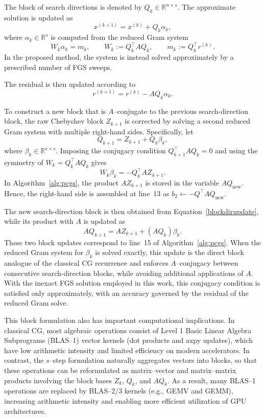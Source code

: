 \documentclass[pdflatex,sn-mathphys-num]{sn-jnl}%
\begin{document}
The block of search directions is denoted by
$Q_k\in\mathbb{R}^{n\times s}$. 
The approximate solution is updated as
\[
x^{(k+1)}=x^{(k)}+Q_k\alpha_k,
\]
where $\alpha_k\in\mathbb{R}^s$ is computed from the
reduced Gram system
\[
W_k\alpha_k=m_k,
\qquad
W_k:=Q_k^\top A Q_k,
\qquad
m_k:=Q_k^\top r^{(k)}.
\]
In the proposed method, the
system is instead solved approximately by a prescribed number of FGS sweeps.

The residual is then updated according to
\[
r^{(k+1)} = r^{(k)} - A Q_k \alpha_k .
\]

To construct a new block that is $A$--conjugate to the previous
search-direction block, the raw Chebyshev block $Z_{k+1}$ is corrected
by solving a second reduced Gram system with multiple right-hand
sides. Specifically, let
\begin{equation}
\label{blockdirupdate}
Q_{k+1}=Z_{k+1}+Q_k\beta_k,
\end{equation}
where $\beta_k\in\mathbb{R}^{s\times s}$. Imposing the conjugacy condition $Q_{k+1}^\top A Q_k=0$ and using the symmetry of $W_k=Q_k^\top A Q_k$
gives
\[
W_k\beta_k=-Q_k^\top A Z_{k+1}.
\]
In Algorithm~\ref{alg:pcgs}, the product $AZ_{k+1}$ is stored in the
variable $AQ_{\mathrm{new}}$. Hence, the right-hand side is assembled
at line~13 as $
b_2\gets -Q^\top AQ_{\mathrm{new}}.$

The new search-direction block is then obtained from
Equation~\eqref{blockdirupdate}, while its product with $A$ is updated
as
\[
A Q_{k+1}
=
A Z_{k+1}
+
(AQ_k)\beta_k.
\]
These two block updates correspond to line~15 of
Algorithm~\ref{alg:pcgs}.
When the reduced Gram system for $\beta_k$ is solved exactly, this
update is the direct block analogue of the classical CG recurrence
and enforces $A$--conjugacy between consecutive search-direction
blocks, while avoiding additional applications of $A$. With the
inexact FGS solution employed in this work, this conjugacy condition
is satisfied only approximately, with an accuracy governed by the
residual of the reduced Gram solve.

This block formulation also has important computational implications.
In classical CG, most algebraic operations consist of Level 1 Basic Linear Algebra Subprograms (BLAS--1) vector kernels
(dot products and axpy updates), which have low arithmetic intensity and
limited efficiency on modern accelerators.
In contrast, the $s$--step formulation naturally aggregates vectors into blocks,
so that these operations can be reformulated as matrix--vector and matrix--matrix
products involving the block bases $Z_k$, $Q_k$, and $AQ_k$.
As a result, many BLAS--1 operations are replaced by BLAS--2/3 kernels
(e.g., GEMV and GEMM), increasing arithmetic intensity and enabling
more efficient utilization of GPU architectures.
\end{document}
